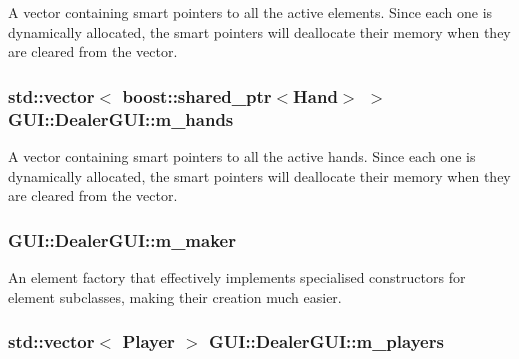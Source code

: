 A vector containing smart pointers to all the active elements. Since each one is dynamically allocated, the smart pointers will deallocate their memory when they are cleared from the vector. 

\hypertarget{classGUI_1_1DealerGUI_ac4d414e9b6f32e1b2fc69d861d7f9244}{
\subsubsection[{m\-\_\-hands}]{\setlength{\rightskip}{0pt plus 5cm}std\-::vector$<$ boost\-::shared\-\_\-ptr$<${\bf Hand}$>$ $>$ G\-U\-I\-::\-Dealer\-G\-U\-I\-::m\-\_\-hands\hspace{0.3cm}{\ttfamily [private]}}}\label{classGUI_1_1DealerGUI_ac4d414e9b6f32e1b2fc69d861d7f9244}


A vector containing smart pointers to all the active hands. Since each one is dynamically allocated, the smart pointers will deallocate their memory when they are cleared from the vector. 

\hypertarget{classGUI_1_1DealerGUI_a0e798f7e0f7cb249e24b9687e9e79e1d}{
\subsubsection[{m\-\_\-maker}]{ G\-U\-I\-::\-Dealer\-G\-U\-I\-::m\-\_\-maker\hspace{0.3cm}{\ttfamily [private]}}}\label{classGUI_1_1DealerGUI_a0e798f7e0f7cb249e24b9687e9e79e1d}


An element factory that effectively implements specialised constructors for element subclasses, making their creation much easier. 

\hypertarget{classGUI_1_1DealerGUI_a387c683523139e78c1b9d662d4062044}{
\subsubsection[{m\-\_\-players}]{\setlength{\rightskip}{0pt plus 5cm}std\-::vector$<$ {\bf Player} $>$ G\-U\-I\-::\-Dealer\-G\-U\-I\-::m\-\_\-players\hspace{0.3cm}{\ttfamily [private]}}}\label{classGUI_1_1DealerGUI_a387c683523139e78c1b9d662d4062044}


